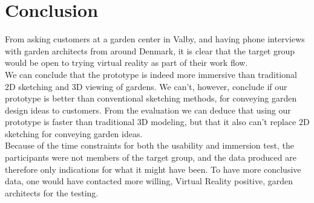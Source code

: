 \chapter{Conclusion}
From asking customers at a garden center in Valby, and having phone interviews with garden architects from around Denmark, it is clear that the target group would be open to trying virtual reality as part of their work flow.\\

We can conclude that the prototype is indeed more immersive than traditional 2D sketching and 3D viewing of gardens. We can't, however, conclude if our prototype is better than conventional sketching methods, for conveying garden design ideas to customers. From the evaluation we can deduce that using our prototype is faster than traditional 3D modeling, but that it also can't replace 2D sketching for conveying garden ideas.\\

Because of the time constraints for both the usability and immersion test, the participants were not members of the target group, and the data produced are therefore only indications for what it might have been. To have more conclusive data, one would have contacted more willing, Virtual Reality positive, garden architects for the testing.\\

